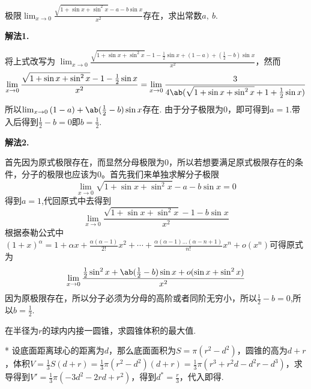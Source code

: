 \begin{problem}
        极限$\lim_{x\to 0}\frac{\sqrt{1+\sin x+\sin^2x}-a-b\sin x}{x^2}$存在，求出常数$a,\ b$.
\end{problem}
\begin{draft}
        \vspace{3em}
\end{draft}
\begin{solution}
\textbf{解法1.}

将上式改写为
$\lim_{x\to 0}\frac{\sqrt{1+\sin x+\sin^2x}-1-\frac{1}{2}\sin x+(1-a)+(\frac{1}{2}-b)\sin x}{x^2}$，然而
\[\lim_{x\to 0}\frac{\sqrt{1+\sin x+\sin^2x}-1-\frac{1}{2}\sin x}{x^2}=\lim_{x\to 0}\frac{3}{4\ab(\sqrt{1+\sin x+\sin^2x}+1+\frac{1}{2}\sin x)}\]
所以$\lim_{x\to 0}{(1-a)+\ab(\frac{1}{2}-b)\sin x}$存在. 由于分子极限为0，即可得到$a=1$.带入后得到$\frac{1}{2}-b=0$即$b=\frac{1}{2}$.

\textbf{解法2.}

首先因为原式极限存在，而显然分母极限为0，所以若想要满足原式极限存在的条件，分子的极限也应该为0。首先我们来单独求解分子极限
\[\lim_{x\to 0}\sqrt{1+\sin x+\sin^2x}-a-b\sin x=0\]
得到$a=1$,代回原式中去得到
\[\lim_{x\to 0}\frac{\sqrt{1+\sin x+\sin^2x}-1-b\sin x}{x^2}\]
根据泰勒公式中$(1+x)^\alpha=1+\alpha x+\frac{\alpha(\alpha-1)}{2!}x^2+\cdots+\frac{\alpha(\alpha-1)\dots(\alpha-n+1)}{n!}x^n+o(x^n)$可得原式为
\[\lim_{x\to 0}\frac{\frac{1}{2}\sin^2x+\ab(\frac{1}{2}-b)\sin x+o(\sin x+\sin^2x)}{x^2}\]
因为原极限存在，所以分子必须为分母的高阶或者同阶无穷小，所以$\frac{1}{2}-b=0$,所以$b=\frac{1}{2}$.
\end{solution}

\begin{problem}
在半径为$r$的球内内接一圆锥，求圆锥体积的最大值.
\end{problem}
\begin{draft}
        \vspace{3em}
\end{draft}
\begin{solution}*
        设底面距离球心的距离为$d$，那么底面面积为$S=\pi(r^2-d^2)$，圆锥的高为$d+r$，体积$V=\frac13S(d+r)=\frac13\pi(r^2-d^2)(d+r)=\frac13\pi(r^3+r^2d-d^2r-d^3)$，求导得到$V'=\frac13\pi(-3d^2-2rd+r^2)$，得到$d^{*}=\frac{r}{3}$，代入即得.
\end{solution}

